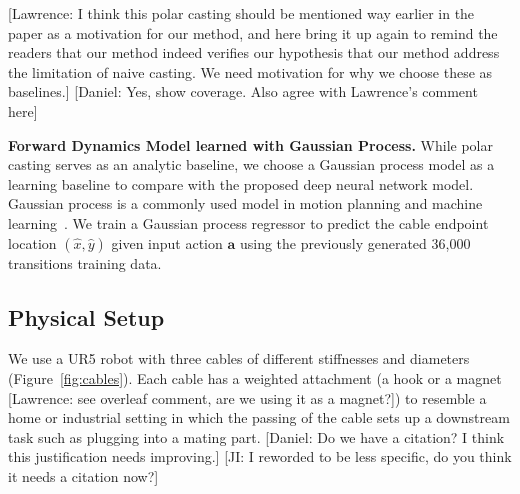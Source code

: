 \documentclass[letterpaper, 10 pt, conference]{ieeeconf}  %
\newcommand{\ba}{\mathbf{a}}
\newcommand{\remark}[3]{{\color{#2}[#1: #3]}}
\newcommand{\daniel}[1]{\remark{Daniel}{blue}{#1}}
\newcommand{\Lawrence}[1]{\remark{Lawrence}{orange}{#1}}
\newcommand{\jeffi}[1]{\remark{JI}{red}{#1}}
\begin{document}
\Lawrence{I think this polar casting should be mentioned way earlier in the paper as a motivation for our method, and here bring it up again to remind the readers that our method indeed verifies our hypothesis that our method address the limitation of naive casting. We need motivation for why we choose these as baselines.} \daniel{Yes, show coverage. Also agree with Lawrence's comment here} 

\textbf{Forward Dynamics Model learned with Gaussian Process.}
While polar casting serves as an analytic baseline, we choose a Gaussian process model as a learning baseline to compare with the proposed deep neural network model. Gaussian process is a commonly used model in motion planning and machine learning~\cite{Gaussian_process_ML}. We train a Gaussian process regressor to predict the cable endpoint location  $(\hat{x}, \hat{y})$ given input action $\ba$ using the previously generated 36,000 transitions training data.


\subsection{Physical Setup}

We use a UR5 robot with three cables of different stiffnesses and diameters (Figure~\ref{fig:cables}). Each cable has a weighted attachment (a hook or a magnet \Lawrence{see overleaf comment, are we using it as a magnet?}) to resemble a home or industrial setting in which the passing of the cable sets up a downstream task such as plugging into a mating part. \daniel{Do we have a citation? I think this justification needs improving.}  \jeffi{I reworded to be less specific, do you think it needs a citation now?}
\end{document}
